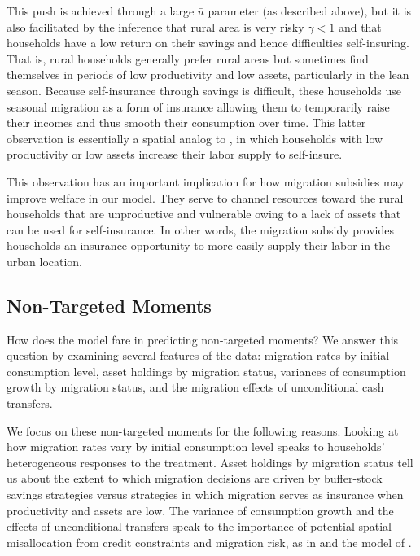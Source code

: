 \documentclass[12pt,pdftex]{article}
\begin{document}
This push is achieved through a large $\bar u$ parameter (as described above), but it is also facilitated by the inference that rural area is very risky $\gamma <1$ and that households have a low return on their savings and hence difficulties self-insuring. That is, rural households generally prefer rural areas but sometimes find themselves in periods of low productivity and low assets, particularly in the lean season. Because self-insurance through savings is difficult, these households use seasonal migration as a form of insurance allowing them to temporarily raise their incomes and thus smooth their consumption over time. This latter observation is essentially a spatial analog to  \citet{PIJOANMAS2006}, in which households with low productivity or low assets increase their labor supply to self-insure.

This observation has an important implication for how migration subsidies may improve welfare in our model. They serve to channel resources toward the rural households that are unproductive and vulnerable owing to a lack of assets that can be used for self-insurance. In other words, the migration subsidy provides households an insurance opportunity to more easily supply their labor in the urban location.

\subsection{Non-Targeted Moments}

How does the model fare in predicting non-targeted moments? We answer this question by examining several features of the data: migration rates by initial consumption level, asset holdings by migration status, variances of consumption growth by migration status, and the migration effects of unconditional cash transfers.

We focus on these non-targeted moments for the following reasons. Looking at how migration rates vary by initial consumption level speaks to households' heterogeneous responses to the treatment.  Asset holdings by migration status tell us about the extent to which migration decisions are driven by buffer-stock savings strategies versus strategies in which migration serves as insurance when productivity and assets are low. The variance of consumption growth and the effects of unconditional transfers speak to the importance of potential spatial misallocation from credit constraints and migration risk, as in \citet{hato70} and the model of \citet{brch14}.
\end{document}
